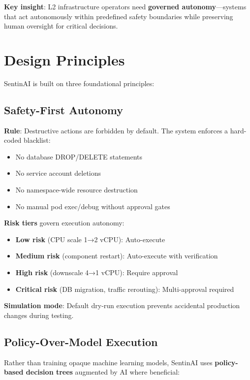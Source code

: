 \documentclass[11pt,a4paper]{article}
\begin{document}
\textbf{Key insight}: L2 infrastructure operators need \textbf{governed autonomy}—systems that act autonomously within predefined safety boundaries while preserving human oversight for critical decisions.

\section{Design Principles}

SentinAI is built on three foundational principles:

\subsection{Safety-First Autonomy}

\textbf{Rule}: Destructive actions are forbidden by default. The system enforces a hard-coded blacklist:
\begin{itemize}
    \item No database DROP/DELETE statements
    \item No service account deletions
    \item No namespace-wide resource destruction
    \item No manual pod exec/debug without approval gates
\end{itemize}

\textbf{Risk tiers} govern execution autonomy:
\begin{itemize}
    \item \textbf{Low risk} (CPU scale 1→2 vCPU): Auto-execute
    \item \textbf{Medium risk} (component restart): Auto-execute with verification
    \item \textbf{High risk} (downscale 4→1 vCPU): Require approval
    \item \textbf{Critical risk} (DB migration, traffic rerouting): Multi-approval required
\end{itemize}

\textbf{Simulation mode}: Default dry-run execution prevents accidental production changes during testing.

\subsection{Policy-Over-Model Execution}

Rather than training opaque machine learning models, SentinAI uses \textbf{policy-based decision trees} augmented by AI where beneficial:
\end{document}
